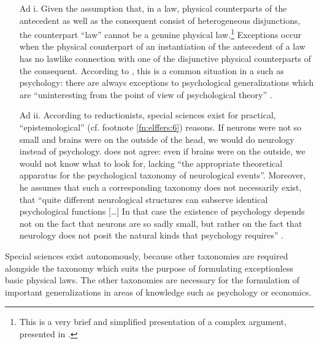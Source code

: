 \documentclass[output=paper]{langscibook}
\begin{document}
\begin{enumerate}
    \item[Ad i.] Given the assumption that, in a  law, physical counterparts of the antecedent as well as the consequent consist of heterogeneous disjunctions, the counterpart ``law'' cannot be a genuine physical law.\footnote{This is a very brief and simplified presentation of a complex argument, presented in \citet[109]{Fodor1974}.} Exceptions occur when the physical counterpart of an instantiation of the antecedent of a  law has no lawlike connection with one of the disjunctive physical counterparts of the consequent. According to {\Fodor}, this is a common situation in a  such as psychology: there are always exceptions to psychological generalizations which are  ``uninteresting from the point of view of psychological theory'' \citep[111]{Fodor1974}.

    \item[Ad ii.] According to reductionists, special sciences exist for practical, ``epistemological'' (cf. footnote \ref{fn:elffers:6}) reasons. If neurons were not so small and brains were on the outside of the head, we would do neurology instead of psychology. {\Fodor} does not agree: even if brains were on the outside, we would not know what to look for, lacking ``the appropriate theoretical apparatus for the psychological taxonomy of neurological events''. Moreover, he assumes that such a corresponding taxonomy does not necessarily exist, that ``quite different neurological structures can subserve identical psychological functions […] In that case the existence of psychology depends not on the fact that neurons are so sadly small, but rather on the fact that neurology does not posit the natural kinds that psychology requires'' \citep[113]{Fodor1974}.
\end{enumerate}

Special sciences exist autonomously, because other taxonomies are required alongside the taxonomy which suits the purpose of formulating exceptionless basic physical laws. The other taxonomies are necessary for the formulation of important generalizations in areas of knowledge such as psychology or economics.
\end{document}
